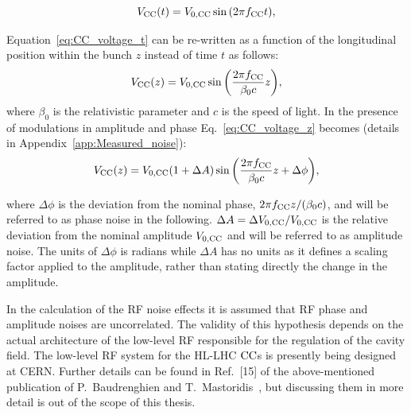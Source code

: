 \begin{equation}\label{eq:CC_voltage_t}
    V_\mathrm{CC}(t) = {V_\mathrm{0, CC}} \sin{\left ( 2 \pi {f_\mathrm{CC}}t \right )},
\end{equation}

Equation~\eqref{eq:CC_voltage_t} can be re-written as a function of the longitudinal position within the bunch $z$ instead of time $t$ as follows:
\begin{equation}\label{eq:CC_voltage_z}
    V_\mathrm{CC}(z) = {V_\mathrm{0, CC}} \sin{\left ( \frac{2\pi {f_\mathrm{CC}}}{\beta_0 c}z \right )},
\end{equation}
where $\beta_0$ is the relativistic parameter and $c$ is the speed of light. %
In the presence of modulations in amplitude and phase Eq.~\eqref{eq:CC_voltage_z} becomes (details in Appendix~\ref{app:Measured_noise}):
\begin{equation}\label{eq:CC_voltage_z}
    V_\mathrm{CC}(z) = {V_\mathrm{0, CC}} (1+\Delta A) \sin{\left ( \frac{2\pi {f_\mathrm{CC}}}{\beta_0 c}z + \Delta \phi \right )},
\end{equation}

where $\Delta \phi$ is the deviation from the nominal phase, $2\pi {f_\mathrm{CC}} z/(\beta_0 c)$, and will be referred to as phase noise in the following. $\Delta A = \Delta {V_\mathrm{0, CC}} / {V_\mathrm{0, CC}}$ is the relative deviation from the nominal amplitude ${V_\mathrm{0, CC}}$ and will be referred to as amplitude noise. The units of $\Delta \phi$ is radians while $\Delta A$ has no units as it defines a scaling factor applied to the amplitude, rather than stating directly the change in the amplitude.


In the calculation of the RF noise effects it is assumed that RF phase and amplitude noises are uncorrelated. The validity of this hypothesis depends on the actual architecture of the low-level RF responsible for the regulation of the cavity field. The low-level RF system for the HL-LHC ${\mathrm{CC}}$s is presently being designed at CERN. Further details can be found in Ref.~[15] of the above-mentioned publication of P.~Baudrenghien and T.~Mastoridis~\cite{PhysRevSTAB.18.101001}, but discussing them in more detail is out of the scope of this thesis.
 


